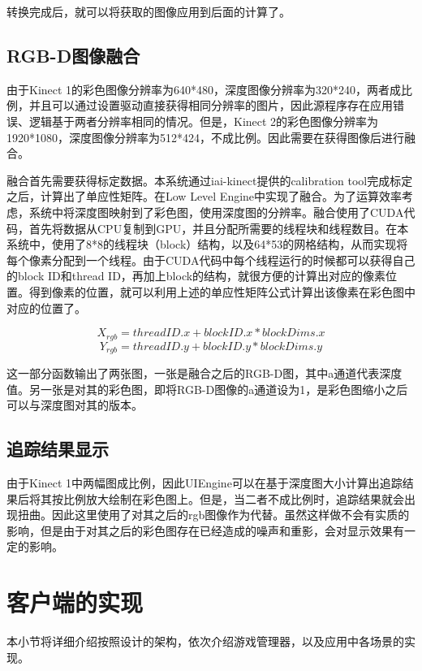转换完成后，就可以将获取的图像应用到后面的计算了。

\subsection{RGB-D图像融合}
由于Kinect 1的彩色图像分辨率为640*480，深度图像分辨率为320*240，两者成比例，并且可以通过设置驱动直接获得相同分辨率的图片，因此源程序存在应用错误、逻辑基于两者分辨率相同的情况。但是，Kinect 2的彩色图像分辨率为1920*1080，深度图像分辨率为512*424，不成比例。因此需要在获得图像后进行融合。

	融合首先需要获得标定数据。本系统通过iai-kinect提供的calibration tool完成标定之后，计算出了单应性矩阵。在Low Level Engine中实现了融合。为了运算效率考虑，系统中将深度图映射到了彩色图，使用深度图的分辨率。融合使用了CUDA代码，首先将数据从CPU复制到GPU，并且分配所需要的线程块和线程数目。在本系统中，使用了8*8的线程块（block）结构，以及64*53的网格结构，从而实现将每个像素分配到一个线程。由于CUDA代码中每个线程运行的时候都可以获得自己的block ID和thread ID，再加上block的结构，就很方便的计算出对应的像素位置。得到像素的位置，就可以利用上述的单应性矩阵公式计算出该像素在彩色图中对应的位置了。
	
\begin{equation}
 X_{rgb} = threadID.x + blockID.x * blockDims.x
\end{equation}
\begin{equation}
 Y_{rgb} = threadID.y + blockID.y * blockDims.y
\end{equation}

这一部分函数输出了两张图，一张是融合之后的RGB-D图，其中a通道代表深度值。另一张是对其的彩色图，即将RGB-D图像的a通道设为1，是彩色图缩小之后可以与深度图对其的版本。

\subsection{追踪结果显示}

由于Kinect 1中两幅图成比例，因此UIEngine可以在基于深度图大小计算出追踪结果后将其按比例放大绘制在彩色图上。但是，当二者不成比例时，追踪结果就会出现扭曲。因此这里使用了对其之后的rgb图像作为代替。虽然这样做不会有实质的影响，但是由于对其之后的彩色图存在已经造成的噪声和重影，会对显示效果有一定的影响。

\section{客户端的实现}
本小节将详细介绍按照设计的架构，依次介绍游戏管理器，以及应用中各场景的实现。

